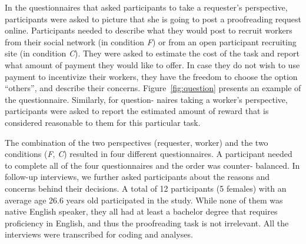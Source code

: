 In the questionnaires that asked participants to take a requester's perspective, 
participants were asked to picture that she is going to post a proofreading request online. 
Participants needed to describe what they would post to recruit workers from their social network (in condition \emph{F}) 
or from an open participant recruiting site (in condition \emph{C}). 
They were asked to estimate the cost of the task and report what amount of payment they would like to offer. 
In case they do not wish to use payment to incentivize their workers, 
they have the freedom to choose the option ``others'', and describe their concerns.  
Figure~\ref{fig:question} presents an example of the questionnaire. 
Similarly, for question- naires taking a worker's perspective, 
participants were asked to report the estimated amount of reward that is considered reasonable to them for this particular task.

The combination of the two perspectives (requester, worker) and the two conditions (\emph{F}, \emph{C}) 
resulted in four different questionnaires. 
A participant needed to complete all of the four questionnaires  and the order was counter- balanced. 
In follow-up interviews, we further asked participants about the reasons and concerns behind their decisions. 
A total of 12 participants (5 females) with an average age 26.6 years old participated in the study. 
While none of them was native English speaker, they all had at least a bachelor degree that requires proficiency in English, 
and thus the proofreading task is not irrelevant. 
All the interviews were transcribed for coding and analyses.




